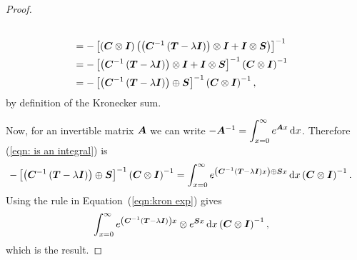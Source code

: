 \begin{proof}
\begin{align}
		\\&= - \left[\left(\boldsymbol{C}\otimes \boldsymbol{I}\right)\left(\left(\boldsymbol{C}^{-1}\left(\boldsymbol{T}-\lambda \boldsymbol{I}\right)\right)\otimes \boldsymbol{I} + \boldsymbol{I}\otimes \boldsymbol{S}\right)\right]^{-1} \nonumber
		\\&= - \left[\left(\boldsymbol{C}^{-1}\left(\boldsymbol{T}-\lambda \boldsymbol{I}\right)\right)\otimes \boldsymbol{I} + \boldsymbol{I}\otimes \boldsymbol{S}\right]^{-1}\left(\boldsymbol{C}\otimes \boldsymbol{I}\right)^{-1} \nonumber
		\\&= - \left[\left(\boldsymbol{C}^{-1}\left(\boldsymbol{T}-\lambda \boldsymbol{I}\right)\right)\oplus \boldsymbol{S}\right]^{-1}\left(\boldsymbol{C}\otimes \boldsymbol{I}\right)^{-1},\label{eqn: is an integral}
	\end{align}
	by definition of the Kronecker sum.
	
	Now, for an invertible matrix \(\boldsymbol A\) we can write \(-\boldsymbol A^{-1} = \displaystyle\int_{x=0}^\infty e^{\boldsymbol Ax}\, \mathrm{d} x\). Therefore (\ref{eqn: is an integral}) is 
	\begin{align*}
		-\left[\left(\boldsymbol{C}^{-1}\left(\boldsymbol{T}-\lambda \boldsymbol{I}\right)\right)\oplus \boldsymbol{S}\right]^{-1}\left(\boldsymbol{C}\otimes \boldsymbol{I}\right)^{-1}
		&= \int_{x=0}^\infty e^{\left(\boldsymbol{C}^{-1}\left(\boldsymbol{T}-\lambda \boldsymbol{I}\right)x\right)\oplus \boldsymbol{S}x}\, \mathrm{d} x\left(\boldsymbol{C}\otimes \boldsymbol{I}\right)^{-1}.
	\end{align*}
	{Using the rule in Equation~(\ref{eqn:kron exp}) gives }
	\begin{align*}
		&\int_{x=0}^\infty e^{\left(\boldsymbol{C}^{-1}\left(\boldsymbol{T}-\lambda \boldsymbol{I}\right)\right)x}\otimes e^{ \boldsymbol{S}x}\, \mathrm{d} x\left(\boldsymbol{C}\otimes \boldsymbol{I}\right)^{-1},
	\end{align*}
	which is the result.
\end{proof}



